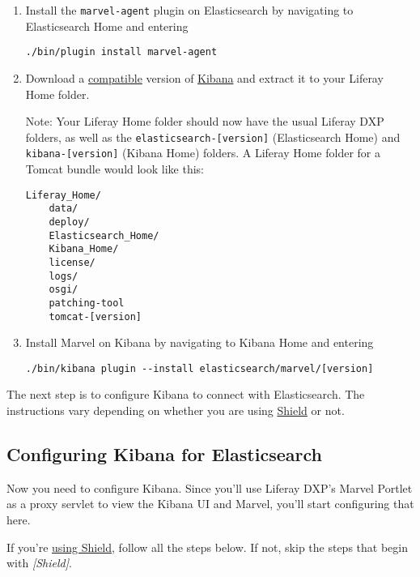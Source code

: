\begin{enumerate}
\def\labelenumi{\arabic{enumi}.}
\item
  Install the \texttt{marvel-agent} plugin on Elasticsearch by
  navigating to Elasticsearch Home and entering

\begin{verbatim}
./bin/plugin install marvel-agent
\end{verbatim}
\item
  Download a
  \href{https://help.liferay.com/hc/en-us/articles/360016511651\#Liferay-Enterprise-Search}{compatible}
  version of \href{https://www.elastic.co/downloads/kibana}{Kibana} and
  extract it to your Liferay Home folder.

  Note: Your Liferay Home folder should now have the usual Liferay DXP
  folders, as well as the \texttt{elasticsearch-{[}version{]}}
  (Elasticsearch Home) and \texttt{kibana-{[}version{]}} (Kibana Home)
  folders. A Liferay Home folder for a Tomcat bundle would look like
  this:

\begin{verbatim}
Liferay_Home/
    data/
    deploy/
    Elasticsearch_Home/
    Kibana_Home/
    license/
    logs/
    osgi/
    patching-tool
    tomcat-[version]
\end{verbatim}
\item
  Install Marvel on Kibana by navigating to Kibana Home and entering

\begin{verbatim}
./bin/kibana plugin --install elasticsearch/marvel/[version]
\end{verbatim}
\end{enumerate}

The next step is to configure Kibana to connect with Elasticsearch. The
instructions vary depending on whether you are using
\href{/docs/7-0/deploy/-/knowledge_base/d/securing-elasticsearch-with-shield}{Shield}
or not.

\subsection{Configuring Kibana for
Elasticsearch}\label{configuring-kibana-for-elasticsearch}

Now you need to configure Kibana. Since you'll use Liferay DXP's Marvel
Portlet as a proxy servlet to view the Kibana UI and Marvel, you'll
start configuring that here.

If you're
\href{https://www.elastic.co/guide/en/shield/current/kibana.html}{using
Shield}, follow all the steps below. If not, skip the steps that begin
with \emph{{[}Shield{]}}.

